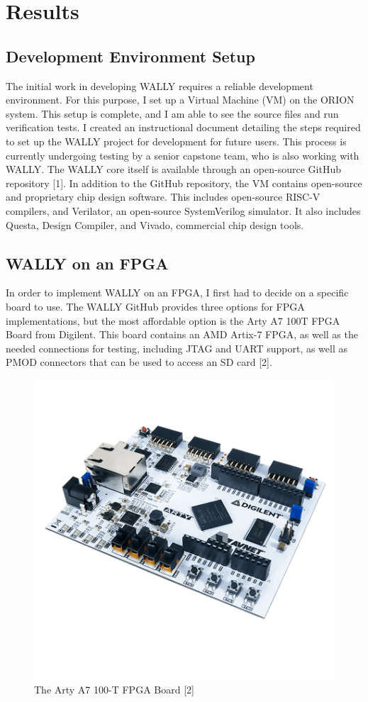 \documentclass[conference]{IEEEtran}
\begin{document}
\section{Results}

\subsection{Development Environment Setup}

The initial work in developing WALLY requires a reliable development environment. For this purpose, I set up a Virtual Machine (VM) on the ORION system. This setup is complete, and I am able to see the source files and run verification tests. I created an instructional document detailing the steps required to set up the WALLY project for development for future users. This process is currently undergoing testing by a senior capstone team, who is also working with WALLY. The WALLY core itself is available through an open-source GitHub repository [1].
In addition to the GitHub repository, the VM contains open-source and proprietary chip design software. This includes open-source RISC-V compilers, and Verilator, an open-source SystemVerilog simulator. It also includes Questa, Design Compiler, and Vivado, commercial chip design tools.


\subsection{WALLY on an FPGA}
In order to implement WALLY on an FPGA, I first had to decide on a specific board to use. The WALLY GitHub provides three options for FPGA implementations, but the most affordable option is the Arty A7 100T FPGA Board from Digilent. This board contains an AMD Artix-7 FPGA, as well as the needed connections for testing, including JTAG and UART support, as well as PMOD connectors that can be used to access an SD card [2].

\begin{figure}[htbp]
\centerline{\includegraphics[width=0.9\linewidth]{Arty.png}}
\caption{The Arty A7 100-T FPGA Board [2]}
\label{fig}
\end{figure}
\end{document}
